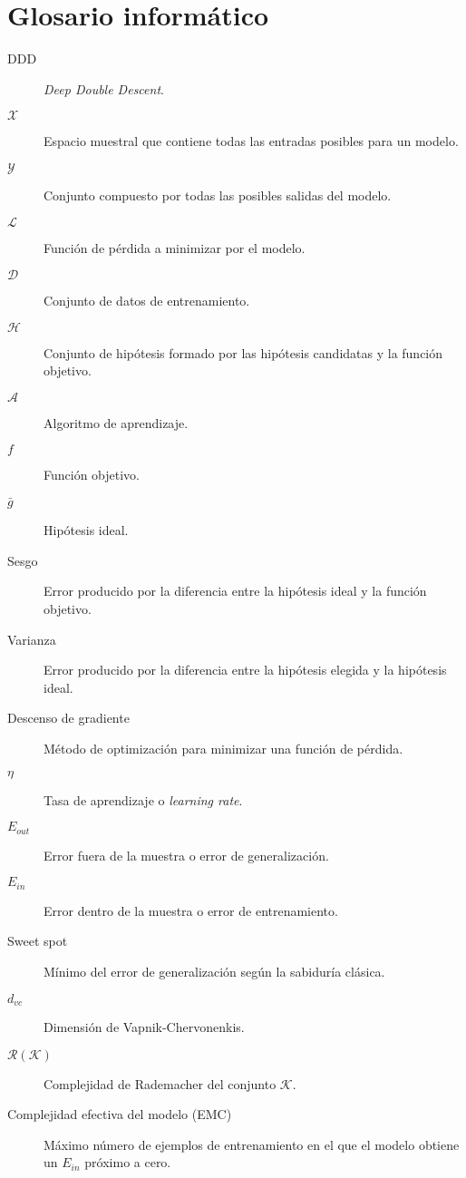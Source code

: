 
\chapter*{Glosario informático}

\begin{description} 
  \item[DDD] \textit{Deep Double Descent}.
  \item[$\mathcal{X}$] Espacio muestral que contiene todas las entradas posibles para un modelo.
  \item[$\mathcal{Y}$] Conjunto compuesto por todas las posibles salidas del modelo.
  \item[$\mathcal{L}$] Función de pérdida a minimizar por el modelo.
  \item[$\mathcal{D}$] Conjunto de datos de entrenamiento.
  \item[$\mathcal{H}$] Conjunto de hipótesis formado por las hipótesis candidatas y la función objetivo.
  \item[$\mathcal{A}$] Algoritmo de aprendizaje. 
  \item[$f$] Función objetivo. 
  \item[$\bar{g}$] Hipótesis ideal.
  \item[Sesgo] Error producido por la diferencia entre la hipótesis ideal y la función objetivo.
  \item[Varianza] Error producido por la diferencia entre la hipótesis elegida y la hipótesis ideal.
  \item[Descenso de gradiente] Método de optimización para minimizar una función de pérdida.
  \item[$\eta$] Tasa de aprendizaje o \textit{learning rate}.
  \item[$E_{out}$] Error fuera de la muestra o error de generalización. 
  \item[$E_{in}$] Error dentro de la muestra o error de entrenamiento.
  \item[Sweet spot] Mínimo del error de generalización según la sabiduría clásica.
  \item[$d_{vc}$] Dimensión de Vapnik-Chervonenkis.
  \item[$\mathcal{R}(\mathcal{K})$] Complejidad de Rademacher del conjunto $\mathcal{K}$.
  \item[Complejidad efectiva del modelo (EMC)] Máximo número de ejemplos de entrenamiento en el que el modelo obtiene un $E_{in}$ próximo a cero.

\end{description}
